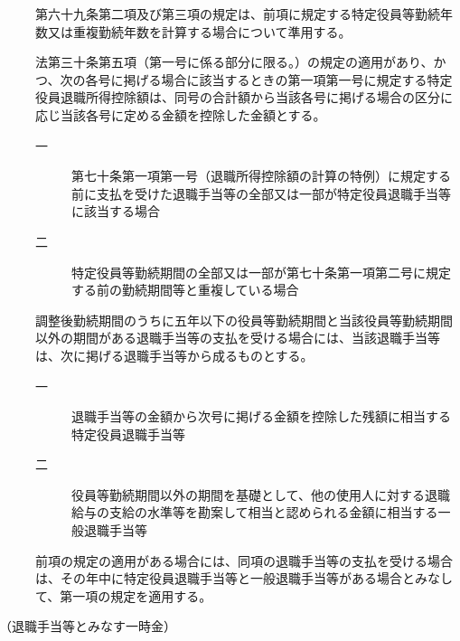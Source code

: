 \documentclass[twocolumn,a4j,10pt]{ltjtarticle}
\begin{document}
\begin{description}
\item[]第六十九条第二項及び第三項の規定は、前項に規定する特定役員等勤続年数又は重複勤続年数を計算する場合について準用する。
\item[]法第三十条第五項（第一号に係る部分に限る。）の規定の適用があり、かつ、次の各号に掲げる場合に該当するときの第一項第一号に規定する特定役員退職所得控除額は、同号の合計額から当該各号に掲げる場合の区分に応じ当該各号に定める金額を控除した金額とする。
\begin{description}
\item[一]第七十条第一項第一号（退職所得控除額の計算の特例）に規定する前に支払を受けた退職手当等の全部又は一部が特定役員退職手当等に該当する場合
\item[二]特定役員等勤続期間の全部又は一部が第七十条第一項第二号に規定する前の勤続期間等と重複している場合
\end{description}
\item[]調整後勤続期間のうちに五年以下の役員等勤続期間と当該役員等勤続期間以外の期間がある退職手当等の支払を受ける場合には、当該退職手当等は、次に掲げる退職手当等から成るものとする。
\begin{description}
\item[一]退職手当等の金額から次号に掲げる金額を控除した残額に相当する特定役員退職手当等
\item[二]役員等勤続期間以外の期間を基礎として、他の使用人に対する退職給与の支給の水準等を勘案して相当と認められる金額に相当する一般退職手当等
\end{description}
\item[]前項の規定の適用がある場合には、同項の退職手当等の支払を受ける場合は、その年中に特定役員退職手当等と一般退職手当等がある場合とみなして、第一項の規定を適用する。
\end{description}
\noindent\hspace{10pt}（退職手当等とみなす一時金）
\end{document}
